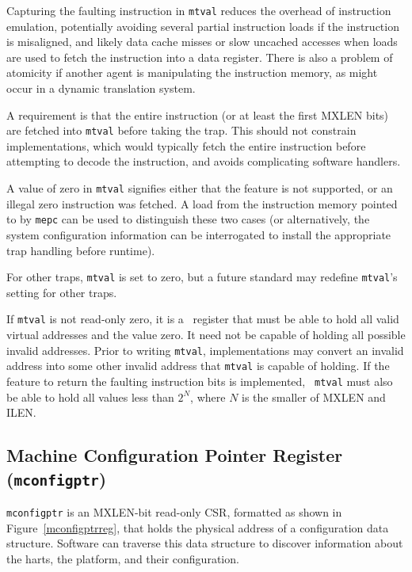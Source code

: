 \begin{commentary}
  Capturing the faulting instruction in {\tt mtval} reduces the
  overhead of instruction emulation, potentially avoiding several
  partial instruction loads if the instruction is misaligned, and
  likely data cache misses or slow uncached accesses when loads are
  used to fetch the instruction into a data register.  There is also a
  problem of atomicity if another agent is manipulating the
  instruction memory, as might occur in a dynamic translation system.

  A requirement is that the entire instruction (or at least the first
  MXLEN bits) are fetched into {\tt mtval} before taking the trap.
  This should not constrain implementations, which would typically
  fetch the entire instruction before attempting to decode the
  instruction, and avoids complicating software handlers.

  A value of zero in {\tt mtval} signifies either that the feature is
  not supported, or an illegal zero instruction was fetched.  A load
  from the instruction memory pointed to by {\tt mepc} can be used to
  distinguish these two cases (or alternatively, the system
  configuration information can be interrogated to install the
  appropriate trap handling before runtime).
\end{commentary}

For other traps, {\tt mtval} is set to zero, but a future standard may
redefine {\tt mtval}'s setting for other traps.

If {\tt mtval} is not read-only zero, it is a \warl\ register that must be
able to hold all valid virtual addresses and the value zero.
It need not be capable of holding all
possible invalid addresses.
Prior to writing {\tt mtval}, implementations may convert an invalid address
into some other invalid address that {\tt mtval} is capable of holding.
If the feature to return the faulting instruction bits is implemented, {\tt
mtval} must also be able to hold all values less than $2^N$, where $N$ is the
smaller of MXLEN and ILEN.

\subsection{Machine Configuration Pointer Register ({\tt mconfigptr})}

{\tt mconfigptr} is an MXLEN-bit read-only CSR, formatted as shown in
Figure~\ref{mconfigptrreg}, that holds the physical address of a configuration
data structure.
Software can traverse this data structure to discover information about
the harts, the platform, and their configuration.


